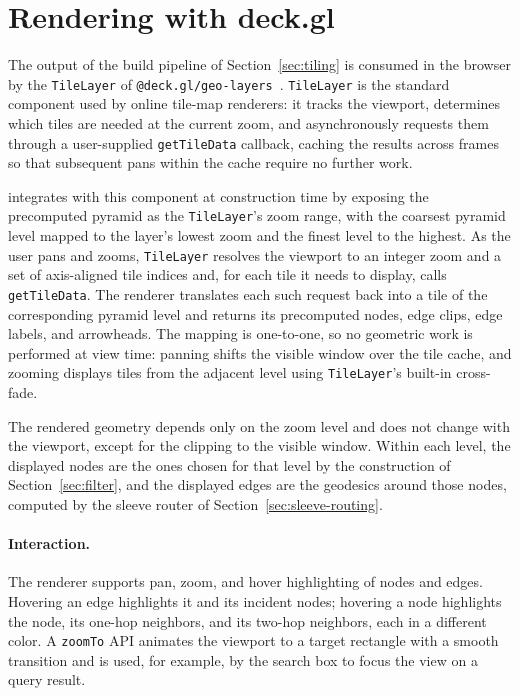 \documentclass[a4paper,USenglish,anonymous]{gd-lipics-v3}
\newcommand{\msagljs}{\textsf{\libname}}
\begin{document}
\section{Rendering with deck.gl}
\label{sec:rendering}

The output of the build pipeline of Section~\ref{sec:tiling} is
consumed in the browser by the \texttt{TileLayer} of
\texttt{@deck.gl/geo-layers}~\cite{deckglTileLayer}. \texttt{TileLayer}
is the standard component used by online tile-map renderers: it
tracks the viewport, determines which tiles are needed at the current
zoom, and asynchronously requests them through a user-supplied
\texttt{getTileData} callback, caching the results across frames so
that subsequent pans within the cache require no further work.

\msagljs{} integrates with this component at construction time by
exposing the precomputed pyramid as the \texttt{TileLayer}'s zoom
range, with the coarsest pyramid level mapped to the layer's lowest
zoom and the finest level to the highest. As the user pans and zooms,
\texttt{TileLayer} resolves the viewport to an integer zoom and a set
of axis-aligned tile indices and, for each tile it needs to display,
calls \texttt{getTileData}. The renderer translates each such request
back into a tile of the corresponding pyramid level and returns its
precomputed nodes, edge clips, edge labels, and arrowheads. The
mapping is one-to-one, so no geometric work is performed at view
time: panning shifts the visible window over the tile cache, and
zooming displays tiles from the adjacent level using
\texttt{TileLayer}'s built-in cross-fade.

The rendered geometry depends only on the zoom level and does not
change with the viewport, except for the clipping to the visible
window. Within each level, the displayed nodes are the ones chosen
for that level by the construction of Section~\ref{sec:filter}, and
the displayed edges are the geodesics around those nodes,
computed by the sleeve router of Section~\ref{sec:sleeve-routing}.

\paragraph{Interaction.}
The renderer supports pan, zoom, and hover highlighting of nodes and
edges. Hovering an edge highlights it and its incident nodes; hovering
a node highlights the node, its one-hop neighbors, and its two-hop
neighbors, each in a different color. A \texttt{zoomTo} API animates
the viewport to a target rectangle with a smooth transition and is
used, for example, by the search box to focus the view on a query
result.
\end{document}
